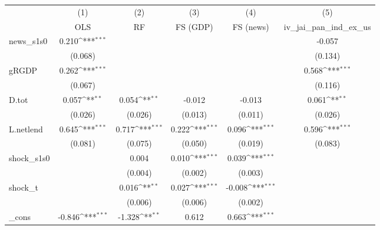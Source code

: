 {
\def\sym#1{\ifmmode^{#1}\else\(^{#1}\)\fi}
\begin{tabular}{l*{5}{c}}
\toprule
            &\multicolumn{1}{c}{(1)}&\multicolumn{1}{c}{(2)}&\multicolumn{1}{c}{(3)}&\multicolumn{1}{c}{(4)}&\multicolumn{1}{c}{(5)}\\
            &\multicolumn{1}{c}{OLS}&\multicolumn{1}{c}{RF}&\multicolumn{1}{c}{FS (GDP)}&\multicolumn{1}{c}{FS (news)}&\multicolumn{1}{c}{iv\_jai\_pan\_ind\_ex\_us}\\
\midrule
news\_s1s0   &       0.210\sym{***}&                     &                     &                     &      -0.057         \\
            &     (0.068)         &                     &                     &                     &     (0.134)         \\
\addlinespace
gRGDP       &       0.262\sym{***}&                     &                     &                     &       0.568\sym{***}\\
            &     (0.067)         &                     &                     &                     &     (0.116)         \\
\addlinespace
D.tot       &       0.057\sym{**} &       0.054\sym{**} &      -0.012         &      -0.013         &       0.061\sym{**} \\
            &     (0.026)         &     (0.026)         &     (0.013)         &     (0.011)         &     (0.026)         \\
\addlinespace
L.netlend   &       0.645\sym{***}&       0.717\sym{***}&       0.222\sym{***}&       0.096\sym{***}&       0.596\sym{***}\\
            &     (0.081)         &     (0.075)         &     (0.050)         &     (0.019)         &     (0.083)         \\
\addlinespace
shock\_s1s0  &                     &       0.004         &       0.010\sym{***}&       0.039\sym{***}&                     \\
            &                     &     (0.004)         &     (0.002)         &     (0.003)         &                     \\
\addlinespace
shock\_t     &                     &       0.016\sym{**} &       0.027\sym{***}&      -0.008\sym{***}&                     \\
            &                     &     (0.006)         &     (0.006)         &     (0.002)         &                     \\
\addlinespace
\_cons      &      -0.846\sym{***}&      -1.328\sym{**} &       0.612         &       0.663\sym{***}&                     \\

\end{tabular}}
